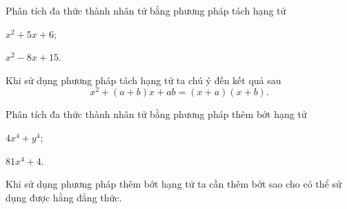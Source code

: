 \begin{vd}
	Phân tích đa thức thành nhân tử bằng phương pháp tách hạng tử
	\begin{enumEX}{2}
		\item $ x^{2}+5x+6 $;
		\item $ x^{2}-8x+15 $.
	\end{enumEX}
	\begin{note}
		Khi sử dụng phương pháp tách hạng tử ta chú ý đến kết quả sau
		\[ 
		x^{2}+(a+b)x+ab=(x+a)(x+b).
		\]
	\end{note}
\end{vd}
\begin{vd}
	Phân tích đa thức thành nhân tử bằng phương pháp thêm bớt hạng tử
	\begin{enumEX}{2}
		\item $ 4x^{4}+y^{4} $;
		\item $ 81x^{4}+4 $.
	\end{enumEX}
	\begin{note}
		Khi sử dụng phương pháp thêm bớt hạng tử ta cần thêm bớt sao cho có thể sử dụng được hằng đẳng thức.
	\end{note}
\end{vd}
